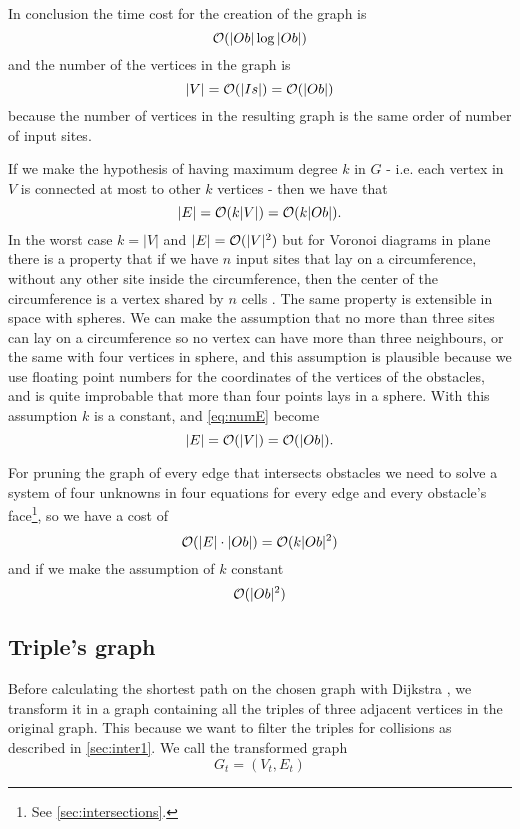 \documentclass[dissertation.tex]{subfiles}
\begin{document}
In conclusion the time cost for the creation of the graph
is
\begin{equation}
  \label{eq:costGraph}
  \mathcal{O}(|Ob|\log |Ob|)
\end{equation}
and the number of the vertices in the graph
is 
\begin{equation}
  \label{eq:numV}
  |V|=\mathcal{O}(|Is|)=\mathcal{O}(|Ob|)
\end{equation}
because the number of vertices in the resulting graph is the
same order of number of input sites.

If we make the hypothesis of having maximum degree $k$ in $G$ -
i.e. each vertex in $V$ is connected at most to other $k$ vertices -
then we have that
\begin{equation}
  \label{eq:numE}
  |E|=\mathcal{O}(k|V|)=\mathcal{O}(k|Ob|).
\end{equation}
In the worst case $k=|V|$ and $|E|=\mathcal{O}(|V|^2)$ but for Voronoi
diagrams in plane there is a property that if we have $n$ input sites
that lay on a circumference, without any other site inside the
circumference, then the center of the circumference is a vertex shared
by $n$ cells \cite{deberg}. The same property is extensible in space with
spheres. We can make the assumption that no more than three sites can lay
on a circumference so no vertex can have more than three neighbours,
or the same with four vertices in sphere, and this assumption is
plausible because we use floating point numbers for the coordinates of
the vertices of the obstacles, and is quite improbable that more than
four points lays in a sphere. With this assumption $k$ is a constant,
and \cref{eq:numE} become
\begin{equation*}
  |E|=\mathcal{O}(|V|)=\mathcal{O}(|Ob|).
\end{equation*}

For pruning the graph of every edge that intersects obstacles we need
to solve a system of four unknowns in four equations for every edge
and every obstacle's face\footnote{See \cref{sec:intersections}.}, so we have a cost of
\begin{equation}
  \label{eq:costPruning}
  \mathcal{O}(|E|\cdot|Ob|)=\mathcal{O}(k|Ob|^2)
\end{equation}
and if we make the assumption of $k$ constant
\begin{equation*}
  \mathcal{O}(|Ob|^2)
\end{equation*}

\subsection{Triple's graph}\label{sec:trigraph}
Before calculating the shortest path on the chosen graph with Dijkstra
\cite{dijkstra}\cite{knuth}, we
transform it in a graph containing all the triples
of three adjacent vertices in the original graph. This because we want
to filter the triples for collisions as described in
\cref{sec:inter1}. We call the transformed graph
$$G_t=(V_t,E_t)$$
\end{document}
